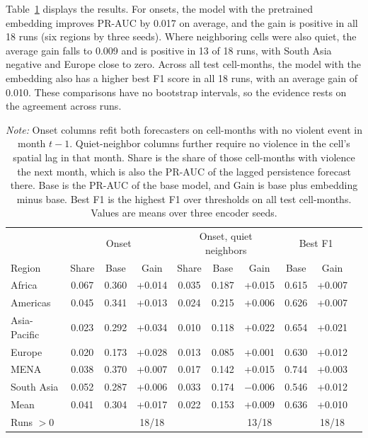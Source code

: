 \documentclass[11pt, letterpaper]{article}
\begin{document}
Table~\ref{tab:onset_subsets} displays the results. For onsets, the model with the pretrained embedding improves PR-AUC by 0.017 on average, and the gain is positive in all 18 runs (six regions by three seeds). Where neighboring cells were also quiet, the average gain falls to 0.009 and is positive in 13 of 18 runs, with South Asia negative and Europe close to zero. Across all test cell-months, the model with the embedding also has a higher best F1 score in all 18 runs, with an average gain of 0.010. These comparisons have no bootstrap intervals, so the evidence rests on the agreement across runs.

\begin{table}[!htbp]
\centering
\caption{Embedding Gain on Onsets and Rare Events (Temporal Test)}
\label{tab:onset_subsets}
\small
\begin{tabular}{lccccccccc}
\hline
& \multicolumn{3}{c}{Onset} & \multicolumn{3}{c}{Onset, quiet neighbors} & \multicolumn{2}{c}{Best F1} \\
Region & Share & Base & Gain & Share & Base & Gain & Base & Gain \\
\hline
Africa & 0.067 & 0.360 & +0.014 & 0.035 & 0.187 & +0.015 & 0.615 & +0.007 \\
Americas & 0.045 & 0.341 & +0.013 & 0.024 & 0.215 & +0.006 & 0.626 & +0.007 \\
Asia-Pacific & 0.023 & 0.292 & +0.034 & 0.010 & 0.118 & +0.022 & 0.654 & +0.021 \\
Europe & 0.020 & 0.173 & +0.028 & 0.013 & 0.085 & +0.001 & 0.630 & +0.012 \\
MENA & 0.038 & 0.370 & +0.007 & 0.017 & 0.142 & +0.015 & 0.744 & +0.003 \\
South Asia & 0.052 & 0.287 & +0.006 & 0.033 & 0.174 & $-$0.006 & 0.546 & +0.012 \\
\hline
Mean & 0.041 & 0.304 & +0.017 & 0.022 & 0.153 & +0.009 & 0.636 & +0.010 \\
Runs $>0$ & & & 18/18 & & & 13/18 & & 18/18 \\
\hline
\end{tabular}
\caption*{\footnotesize \textit{Note:} Onset columns refit both forecasters on cell-months with no violent event in month $t-1$. Quiet-neighbor columns further require no violence in the cell's spatial lag in that month. Share is the share of those cell-months with violence the next month, which is also the PR-AUC of the lagged persistence forecast there. Base is the PR-AUC of the base model, and Gain is base plus embedding minus base. Best F1 is the highest F1 over thresholds on all test cell-months. Values are means over three encoder seeds.}
\end{table}
\end{document}
